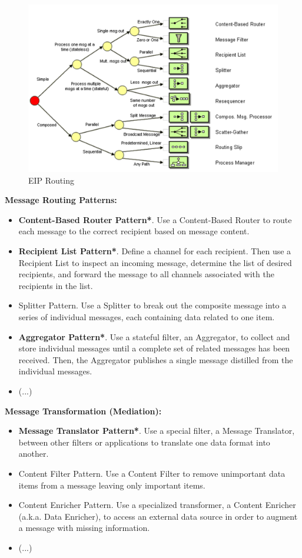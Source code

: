 \documentclass[../Main.tex]{subfiles}
\begin{document}
\begin{figure}[H]
    \centering
    \includegraphics[width=0.9\linewidth]{Images/eip-message-routing-categories.png}
    \caption{EIP Routing}
\end{figure}

\begin{multicols}{2}
    \textbf{Message Routing Patterns:}
    \begin{itemize}
        \item \textbf{Content-Based Router Pattern*}. Use a Content-Based Router to route each message to the correct recipient based on message content. 
        \item \textbf{Recipient List Pattern*}. Define a channel for each recipient. Then use a Recipient List to inspect an incoming message, determine 
        the list of desired recipients, and forward the message to all channels associated with the recipients in the 
        list.
        \item Splitter Pattern. Use a Splitter to break out the composite message into a series of individual messages, each containing 
        data related to one item.
        \item \textbf{Aggregator Pattern*}. Use a stateful filter, an Aggregator, to collect and store individual messages until a complete set of related 
        messages has been received. Then, the Aggregator publishes a single message distilled from the individual 
        messages.
        \item (...)
    \end{itemize}
    \textbf{Message Transformation (Mediation):}
    \begin{itemize}
        \item \textbf{Message Translator Pattern*}. Use a special filter, a Message Translator, between other filters or applications to translate 
        one data format into another.
        \item Content Filter Pattern.  Use a Content Filter to remove unimportant data items from a message leaving only important items.
        \item Content Enricher Pattern. Use a specialized transformer, a Content Enricher (a.k.a. Data Enricher), to access an external data source 
        in order to augment a message with missing information.
        \item (...)
    \end{itemize}
\end{multicols}
\end{document}
